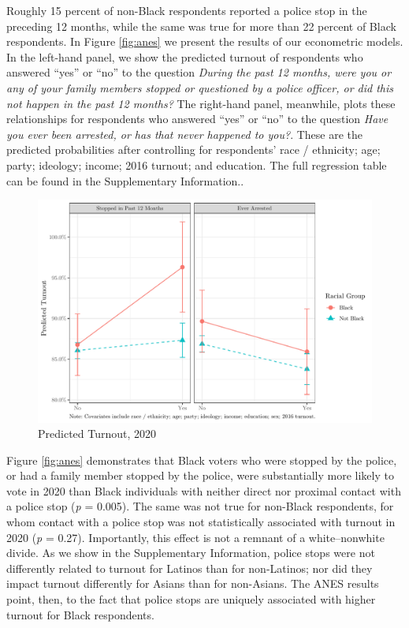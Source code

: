 \documentclass[
  12pt,
]{article}
\begin{document}
Roughly 15 percent of non-Black respondents reported a police stop in the preceding 12 months, while the same was true for more than 22 percent of Black respondents. In Figure \ref{fig:anes} we present the results of our econometric models. In the left-hand panel, we show the predicted turnout of respondents who answered ``yes'' or ``no'' to the question \emph{During the past 12 months, were you or any of your family members stopped or questioned by a police officer, or did this not happen in the past 12 months?} The right-hand panel, meanwhile, plots these relationships for respondents who answered ``yes'' or ``no'' to the question \emph{Have you ever been arrested, or has that never happened to you?}. These are the predicted probabilities after controlling for respondents' race / ethnicity; age; party; ideology; income; 2016 turnout; and education. The full regression table can be found in the Supplementary Information..

\begin{figure}[!htpb]

{\centering \includegraphics{draft_paper_files/figure-latex/anes-cross-1} 

}

\caption{\label{fig:anes}Predicted Turnout, 2020}\label{fig:anes-cross}
\end{figure}

Figure \ref{fig:anes} demonstrates that Black voters who were stopped by the police, or had a family member stopped by the police, were substantially more likely to vote in 2020 than Black individuals with neither direct nor proximal contact with a police stop (\emph{p} = 0.005). The same was not true for non-Black respondents, for whom contact with a police stop was not statistically associated with turnout in 2020 (\emph{p} = 0.27). Importantly, this effect is not a remnant of a white--nonwhite divide. As we show in the Supplementary Information, police stops were not differently related to turnout for Latinos than for non-Latinos; nor did they impact turnout differently for Asians than for non-Asians. The ANES results point, then, to the fact that police stops are uniquely associated with higher turnout for Black respondents.
\end{document}
